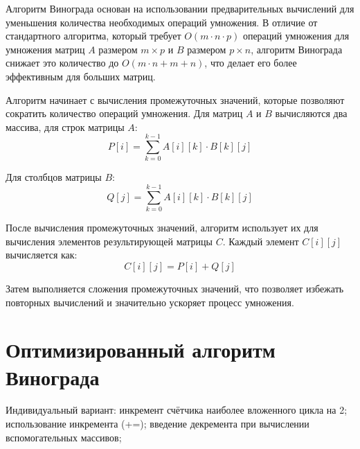 Алгоритм Винограда основан на использовании предварительных вычислений для уменьшения количества необходимых операций умножения. В отличие от стандартного алгоритма, который требует $O(m \cdot n \cdot p)$ операций умножения для умножения матриц $A$ размером $m×p$ и $B$ размером $p×n$, алгоритм Винограда снижает это количество до $O(m \cdot n+m+n)$, что делает его более эффективным для больших матриц.

Алгоритм начинает с вычисления промежуточных значений, которые позволяют сократить количество операций умножения. Для матриц $A$ и $B$ вычисляются два массива, для строк матрицы $A$: 
\begin{equation}
	\label{eq:grapeA}
	P[i] = \sum_{k=0}^{k-1} A[i][k] \cdot B[k][j]
\end{equation}	

Для столбцов матрицы $B$:
\begin{equation}
	\label{eq:grapeB}
	Q[j] = \sum_{k=0}^{k-1} A[i][k] \cdot B[k][j]
\end{equation}	

После вычисления промежуточных значений, алгоритм использует их для вычисления элементов результирующей матрицы $C$. Каждый элемент $C[i][j]$ вычисляется как:
\begin{equation}
	\label{eq:grapeRes}
	C[i][j] = P[i] + Q[j]
\end{equation}	

Затем выполняется сложения промежуточных значений, что позволяет избежать повторных вычислений и значительно ускоряет процесс умножения.


\section{Оптимизированный алгоритм Винограда}

Индивидуальный вариант: инкремент счётчика наиболее вложенного цикла на 2; использование инкремента (+=); введение декремента при вычислении вспомогательных массивов;